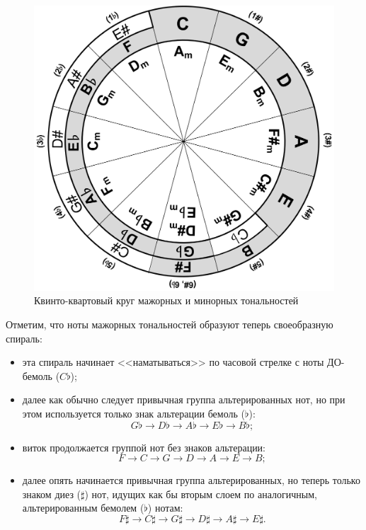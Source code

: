 \begin{figure}[!ht]
    \centering
    \includegraphics[scale=0.8]{fig/kvinto-kvarto/kvinto-kvarto-final} 
    \caption{Квинто-квартовый круг мажорных и минорных тональностей}\label{fig:harmony:kvinto-kvarto:kvinto-kvarto-final}
\end{figure}

Отметим, что ноты мажорных тональностей образуют теперь своеобразную спираль: 
\begin{itemize}
    \item эта спираль начинает <<наматываться>> по часовой стрелке с ноты ДО-бемоль ($C\flat$);
    
    \item далее как обычно следует привычная группа альтерированных нот, но при этом используется только знак альтерации бемоль ($\flat$):
    \[
        {G\flat}\rightarrow
        {D\flat}\rightarrow
        {A\flat}\rightarrow
        {E\flat}\rightarrow
        {B\flat};
    \]
    
    \item виток продолжается группой нот без знаков альтерации:
    \[
        F\rightarrow
        C\rightarrow
        G\rightarrow
        D\rightarrow
        A\rightarrow
        E\rightarrow
        B;
    \]
    
    \item далее опять начинается привычная группа альтерированных, но теперь только знаком диез ($\sharp$) нот, идущих как бы вторым слоем по аналогичным, альтерированным бемолем ($\flat$) нотам: 
    \[
        {F\sharp}\rightarrow
        {C\sharp}\rightarrow
        {G\sharp}\rightarrow
        {D\sharp}\rightarrow
        {A\sharp}\rightarrow
        {E\sharp}.
    \]
\end{itemize}

